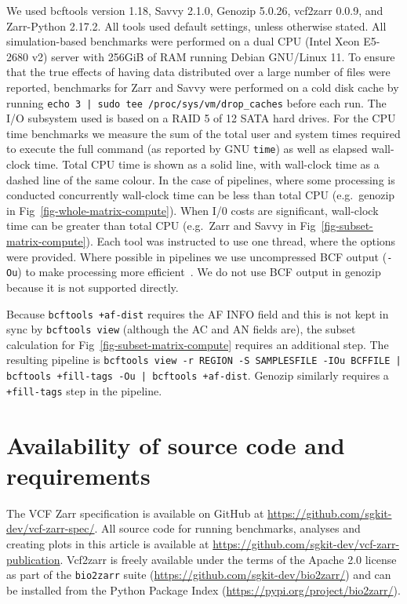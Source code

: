 \documentclass[a4paper,num-refs]{oup-contemporary}
\begin{document}
We used bcftools version 1.18, Savvy 2.1.0, Genozip 5.0.26,
vcf2zarr 0.0.9, and Zarr-Python 2.17.2. 
All tools used default settings, 
unless otherwise stated.
All simulation-based benchmarks were performed on a 
dual CPU (Intel Xeon E5-2680 v2)
server with 256GiB of RAM running Debian GNU/Linux 11.
To ensure that the true effects of having data distributed over a large 
number of files were reported, benchmarks for Zarr and Savvy were 
performed on a cold disk cache by running 
\texttt{echo 3 | sudo tee /proc/sys/vm/drop\_caches} before each run.
The I/O subsystem used is based on a RAID 5 of 12 SATA hard drives.
For the CPU time benchmarks we measure the sum of the total user and
system times required to execute the full command (as reported by GNU
\texttt{time}) as well as elapsed wall-clock time. Total CPU
time is shown as a solid line, with wall-clock time as a dashed line 
of the same colour. In the case of pipelines, where some processing 
is conducted concurrently wall-clock time can be less than total
CPU (e.g.\ genozip in Fig~\ref{fig-whole-matrix-compute}). 
When I/0 costs are significant, wall-clock time can be greater 
than total CPU (e.g.\ Zarr and Savvy in Fig~\ref{fig-subset-matrix-compute}).
Each tool was instructed to use one thread, where the options
were provided. 
Where possible in pipelines we use uncompressed BCF
output (\texttt{-Ou}) to make processing 
more efficient~\citep{danecek2021twelve}.
We do not use BCF output in genozip because it is not supported
directly.

Because \texttt{bcftools +af-dist} requires the AF INFO field
and this is not kept in sync by \texttt{bcftools view}  
(although the AC and AN fields are), the subset calculation 
for Fig~\ref{fig-subset-matrix-compute} requires an additional step. 
The resulting pipeline is
\texttt{bcftools view -r REGION -S SAMPLESFILE -IOu BCFFILE | 
bcftools +fill-tags -Ou | bcftools +af-dist}. Genozip similarly
requires a \texttt{+fill-tags} step in the pipeline.

\section{Availability of source code and requirements}

The VCF Zarr specification is available on GitHub at 
\url{https://github.com/sgkit-dev/vcf-zarr-spec/}.
All source code for running benchmarks, analyses and creating 
plots in this article is available at
\url{https://github.com/sgkit-dev/vcf-zarr-publication}.
Vcf2zarr is freely available under the terms of the Apache 2.0 
license as part of the \texttt{bio2zarr} 
suite (\url{https://github.com/sgkit-dev/bio2zarr/}) 
and can be installed from the Python Package Index
(\url{https://pypi.org/project/bio2zarr/}).
\end{document}
